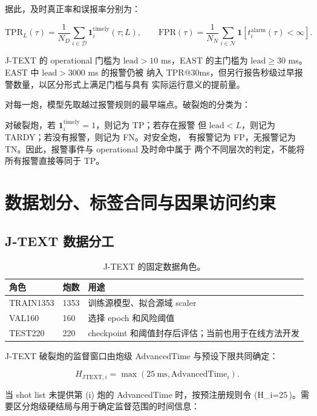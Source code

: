\documentclass[11pt,a4paper]{article}
\begin{document}
据此，及时真正率和误报率分别为：

\[
\mathrm{TPR}_{L}(\tau)=
\frac{1}{N_D}\sum_{i\in\mathcal{D}}
\mathbf{1}_{i}^{\mathrm{timely}}(\tau;L),
\qquad
\mathrm{FPR}(\tau)=
\frac{1}{N_N}\sum_{i\in\mathcal{N}}
\mathbf{1}\!\left[t_i^{\mathrm{alarm}}(\tau)<\infty\right].
\]

J-TEXT 的 operational 门槛为 \(\mathrm{lead}>10\) ms，EAST 的主门槛为
\(\mathrm{lead}\geq30\) ms。EAST 中 \(\mathrm{lead}>3000\) ms 的报警仍被
纳入 TPR@30ms，但另行报告秒级过早报警数量，以区分形式上满足门槛与具有
实际运行意义的提前量。

对每一炮，模型先取越过报警规则的最早端点。破裂炮的分类为：

对破裂炮，若 \(\mathbf{1}_{i}^{\mathrm{timely}}=1\)，则记为 TP；若存在报警
但 \(\mathrm{lead}<L\)，则记为 TARDY；若没有报警，则记为 FN。对安全炮，
有报警记为 FP，无报警记为 TN。因此，报警事件与 operational 及时命中属于
两个不同层次的判定，不能将所有报警直接等同于 TP。

\section{数据划分、标签合同与因果访问约束}

\subsection{J-TEXT 数据分工}

\begin{table}[H]
\centering
\caption{J-TEXT 的固定数据角色。}
\begin{tabularx}{\textwidth}{l C{18mm} Y}
\toprule
角色 & 炮数 & 用途\\
\midrule
TRAIN1353 & 1353 & 训练源模型、拟合源域 scaler\\
VAL160 & 160 & 选择 epoch 和风险阈值\\
TEST220 & 220 & checkpoint 和阈值封存后评估；当前也用于在线方法开发\\
\bottomrule
\end{tabularx}
\end{table}

J-TEXT 破裂炮的监督窗口由炮级 AdvancedTime 与预设下限共同确定：

\[
H_{\mathrm{JTEXT},i}
=\max\left(25\ \mathrm{ms},\mathrm{AdvancedTime}_i\right).
\]

当 shot list 未提供第 (i) 炮的 AdvancedTime 时，按预注册规则令
(H_i=25\,)。需要区分炮级硬结局与用于确定监督范围的时间信息：
\end{document}
